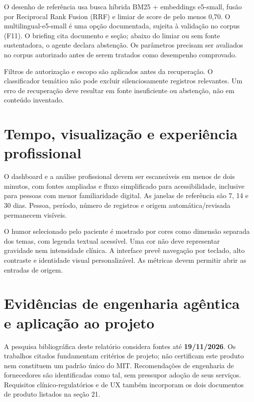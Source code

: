 \documentclass[11pt,a4paper]{article}
\begin{document}
O desenho de referência usa busca híbrida BM25 + embeddings e5-small, fusão por Reciprocal Rank Fusion (RRF) e limiar de score de pelo menos 0,70. O multilingual-e5-small é uma opção documentada, sujeita à validação no corpus (F11). O briefing cita documento e seção; abaixo do limiar ou sem fonte sustentadora, o agente declara abstenção. Os parâmetros precisam ser avaliados no corpus autorizado antes de serem tratados como desempenho comprovado.

Filtros de autorização e escopo são aplicados antes da recuperação. O classificador temático não pode excluir silenciosamente registros relevantes. Um erro de recuperação deve resultar em fonte insuficiente ou abstenção, não em conteúdo inventado.

\section{Tempo, visualização e experiência profissional}
O dashboard e a análise profissional devem ser escaneáveis em menos de dois minutos, com fontes ampliadas e fluxo simplificado para acessibilidade, inclusive para pessoas com menor familiaridade digital. As janelas de referência são 7, 14 e 30 dias. Pessoa, período, número de registros e origem automática/revisada permanecem visíveis.

O humor selecionado pelo paciente é mostrado por cores como dimensão separada dos temas, com legenda textual acessível. Uma cor não deve representar gravidade nem intensidade clínica. A interface prevê navegação por teclado, alto contraste e identidade visual personalizável. As métricas devem permitir abrir as entradas de origem.

\section{Evidências de engenharia agêntica e aplicação ao projeto}
A pesquisa bibliográfica deste relatório considera fontes até \textbf{19/11/2026}. Os trabalhos citados fundamentam critérios de projeto; não certificam este produto nem constituem um padrão único do MIT. Recomendações de engenharia de fornecedores são identificadas como tal, sem pressupor adoção de seus serviços. Requisitos clínico-regulatórios e de UX também incorporam os dois documentos de produto listados na seção 21.
\end{document}

